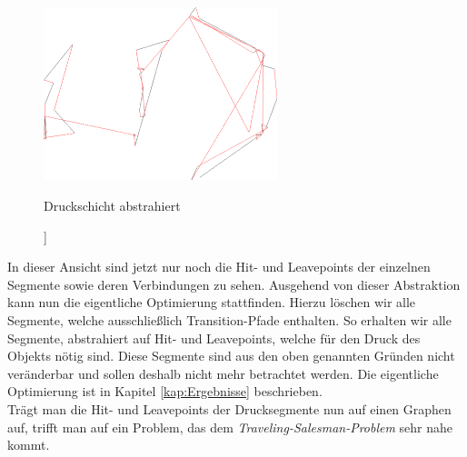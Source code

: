 \documentclass[12pt, a4paper]{article}
\begin{document}
\begin{figure}
	\includegraphics[width=6.8cm]{3DBenchylarge_gcode-224-Abstract-Transitions.png}
	\caption[Druckschicht abstrahiert\newline Screenshot erstellt mit unserem PrintOptimizer]]{Druckschicht abstrahiert}
    \vspace{-4.3cm}
    \label{img:224AbsTrans}
\end{figure} In dieser Ansicht sind jetzt nur noch die Hit- und Leavepoints der einzelnen Segmente sowie deren Verbindungen zu sehen. Ausgehend von dieser Abstraktion kann nun die eigentliche Optimierung stattfinden. Hierzu löschen wir alle Segmente, welche ausschließlich Transition-Pfade enthalten. So erhalten wir alle Segmente, abstrahiert auf Hit- und Leavepoints, welche für den Druck des Objekts nötig sind. Diese Segmente sind aus den oben genannten Gründen nicht veränderbar und sollen deshalb nicht mehr betrachtet werden. Die eigentliche Optimierung ist in Kapitel \ref{kap:Ergebnisse} beschrieben.\\

Trägt man die Hit- und Leavepoints der Drucksegmente nun auf einen Graphen auf, trifft man auf ein Problem, das dem \textit{Traveling-Salesman-Problem} sehr nahe kommt.
\vspace{3.5cm}
\end{document}
